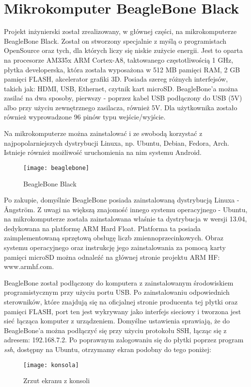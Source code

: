 \chapter{Mikrokomputer BeagleBone Black}
Projekt inżynierski został zrealizowany, w głównej części, na mikrokomputerze BeagleBone Black. Został on stworzony specjalnie z myślą o programistach OpenSource oraz tych, dla których liczy się niskie zużycie energii. Jest to oparta na procesorze AM335x ARM Cortex-A8, taktowanego częstotliwością 1 GHz, płytka developerska, która została wyposażona w 512 MB pamięci RAM, 2 GB pamięci FLASH, akcelerator grafiki 3D. Posiada szereg różnych interfejsów, takich jak: HDMI, USB, Ethernet, czytnik kart microSD. BeagleBone'a można zasilać na dwa sposoby, pierwszy - poprzez kabel USB podłączony do USB (5V) albo przy użyciu zewnętrznego zasilacza, również 5V. Dla użytkownika zostało również wyprowadzone 96 pinów typu wejście/wyjście.

Na mikrokomputerze można zainstalować i ze swobodą korzystać z najpopolarniejszych dystrybucji Linuxa, np. Ubuntu, Debian, Fedora, Arch. Istnieje również możliwość uruchomienia na nim systemu Android.

\begin{figure}[h]
\centering
\texttt{[image: beaglebone]}
\caption{BeagleBone Black}
\label{fig:beaglebone}
\end{figure}

Po zakupie, domyślnie BeagleBone posiada zainstalowaną dystrybucją Linuxa - Ångström. Z uwagi na większą znajomość innego systemu operacyjnego - Ubuntu, na mikrokomputerze została zainstalowana właśnie ta dystrybucja w wersji 13.04, dedykowana na platformę ARM Hard Float. Platforma ta posiada zaimplementowaną sprzętową obsługę liczb zmiennoprzecinkowych. Obraz systemu operacyjnego oraz instrukcję jego zainstalowania za pomocą karty pamięci microSD można odnaleźć na głównej stronie projektu ARM HF: www.armhf.com.

BeagleBone został podłączony do komputera z zainstalowanym środowiskiem programistycznym przy użyciu portu USB. Po zainstalowaniu odpowiednich sterowników, które znajdują się na oficjalnej stronie producenta tej płytki oraz pamięci FLASH, port ten jest wykrywany jako interfejs sieciowy i tworzona jest sieć łącząca komputer z urządzeniem. Domyślne ustawienia sprawiają, że do BeagleBone'a można podłączyć się przy użyciu protokołu SSH, łącząc się z adresem: 192.168.7.2. Po poprawnym zalogowaniu się do płytki poprzez program \emph{ssh}, dostępny na Ubuntu, otrzymamy ekran podobny do tego poniżej:

\begin{figure}[h]
\centering
\texttt{[image: konsola]}
\caption{Zrzut ekranu z konsoli}
\label{fig:konsola}
\end{figure}